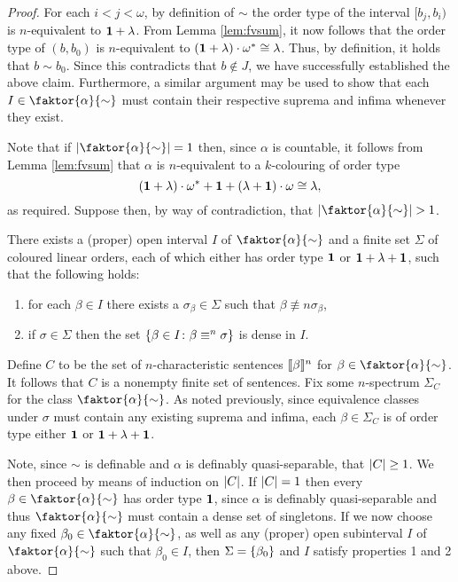 \begin{proof}
	For each $i<j<\omega$, by definition of $\sim$ the order type of the
	interval $[b_{j},b_{i})$ is $n$-equivalent to $\mathbf{1}+\lambda$.  From Lemma
	\ref{lem:fvsum}, it now follows that the order type of $(b,b_{0})$ is
	$n$-equivalent to $(\mathbf{1}+\lambda)\cdot{\omega}^\ast\cong\lambda$.  Thus, by
	definition, it holds that $b\sim b_{0}$.  Since this contradicts that
	$b\notin J$, we have successfully established the above claim.  Furthermore,
	a similar argument may be used to show that each $I\in\faktor{\alpha}{\sim}$
	must contain their respective suprema and infima whenever they exist.

	Note that if $\card{\faktor{\alpha}{\sim}}=1$ then, since $\alpha$ is
	countable, it follows from Lemma \ref{lem:fvsum} that $\alpha$ is $n$-equivalent
	to a $k$-colouring of order type
	\begin{equation}
		(\mathbf{1}+\lambda)\cdot{\omega}^\ast+\mathbf{1}+(\lambda+\mathbf{1})\cdot\omega\cong\lambda,
	\end{equation}
	as required.  Suppose then, by way of contradiction, that
	$\card{\faktor{\alpha}{\sim}}>1$.
	\begin{claim}
		There exists a (proper) open interval $I$ of $\faktor{\alpha}{\sim}$ and
		a finite set $\Sigma$ of coloured linear orders, each of which either has order
		type $\mathbf{1}$ or $\mathbf{1}+\lambda+\mathbf{1}$, such that the following holds:
		\begin{enumerate}[nosep]
			\item for each $\beta\in I$ there exists a $\sigma_\beta\in\Sigma$
			      such that $\beta\nequiv{n}\sigma_\beta$,

			\item if $\sigma\in\Sigma$ then the set $\left\lbrace \beta\in I\colon \beta\equiv^{n}\sigma \right\rbrace$ is dense in $I$.
		\end{enumerate}
	\end{claim}

	Define $C$ to be the set of $n$-characteristic sentences $\llbracket\beta\rrbracket^{n}$
	for $\beta\in\faktor{\alpha}{\sim}$. It follows that $C$ is a nonempty
	finite set of sentences. Fix some $n$-spectrum $\Sigma_{C}$ for the class
	$\faktor{\alpha}{\sim}$.  As noted previously, since equivalence classes
	under $\sigma$ must contain any existing suprema and infima, each
	$\beta\in\Sigma_C$ is of order type either $\mathbf{1}$ or $\mathbf{1}+\lambda+\mathbf{1}$.

	Note, since $\sim$ is definable and $\alpha$ is definably quasi-separable,
	that $\left\lvert C\right\rvert\geq 1$.  We then proceed by means of induction on $\left\lvert C\right\rvert$.
	If $\left\lvert C\right\rvert=1$ then every $\beta\in\faktor{\alpha}{\sim}$ has order type
	$\mathbf{1}$, since $\alpha$ is definably quasi-separable and thus
	$\faktor{\alpha}{\sim}$ must contain a dense set of singletons.  If we now
	choose any fixed $\beta_0\in\faktor{\alpha}{\sim}$, as well as any (proper)
	open subinterval $I$ of $\faktor{\alpha}{\sim}$ such that $\beta_0\in I$,
	then $\Sigma=\left\lbrace \beta_0\right\rbrace$ and $I$ satisfy properties 1 and 2 above.


\end{proof}
